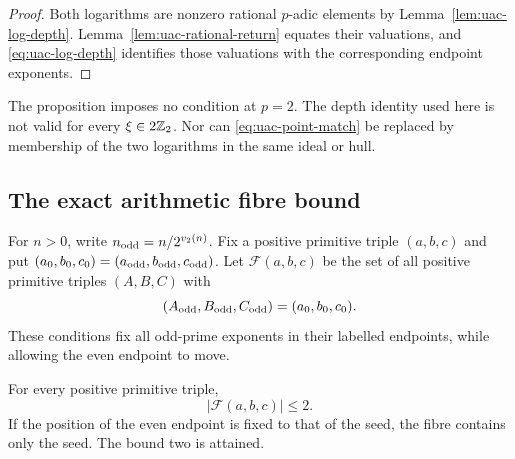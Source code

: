 \begin{proof}
Both logarithms are nonzero rational $p$-adic elements by
Lemma~\ref{lem:uac-log-depth}. Lemma~\ref{lem:uac-rational-return}
equates their valuations, and \eqref{eq:uac-log-depth} identifies
those valuations with the corresponding endpoint exponents.
\end{proof}

The proposition imposes no condition at $p=2$.
The depth identity used here is not valid for every
$\xi\in2\mathbb Z_2$. Nor can \eqref{eq:uac-point-match} be replaced by
membership of the two logarithms in the same ideal or hull.

\subsection{The exact arithmetic fibre bound}

For $n>0$, write $n_{\rm odd}=n/2^{v_2(n)}$. Fix a positive primitive
triple $(a,b,c)$ and put
$(a_0,b_0,c_0)=(a_{\rm odd},b_{\rm odd},c_{\rm odd})$.
Let $\mathcal F(a,b,c)$ be the set of all positive primitive triples
$(A,B,C)$ with
\[
                    (A_{\rm odd},B_{\rm odd},C_{\rm odd})
                                      =(a_0,b_0,c_0).
\]
These conditions fix all odd-prime exponents in their labelled
endpoints, while allowing the even endpoint to move.

\begin{theorem}
\label{thm:uac-odd-fibre}
For every positive primitive triple,
\begin{equation}\label{eq:uac-fibre-bound}
                              |\mathcal F(a,b,c)|\le2.
\end{equation}
If the position of the even endpoint is fixed to that of the seed,
the fibre contains only the seed. The bound two is attained.
\end{theorem}

